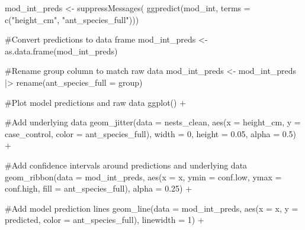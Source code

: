 \documentclass[
  letterpaper,
  DIV=11,
  numbers=noendperiod]{scrartcl}
\newenvironment{Shaded}{\begin{snugshade}}{\end{snugshade}}
\newcommand{\AttributeTok}[1]{\textcolor[rgb]{0.40,0.45,0.13}{#1}}
\newcommand{\CommentTok}[1]{\textcolor[rgb]{0.37,0.37,0.37}{#1}}
\newcommand{\DecValTok}[1]{\textcolor[rgb]{0.68,0.00,0.00}{#1}}
\newcommand{\FloatTok}[1]{\textcolor[rgb]{0.68,0.00,0.00}{#1}}
\newcommand{\FunctionTok}[1]{\textcolor[rgb]{0.28,0.35,0.67}{#1}}
\newcommand{\NormalTok}[1]{\textcolor[rgb]{0.00,0.23,0.31}{#1}}
\newcommand{\OtherTok}[1]{\textcolor[rgb]{0.00,0.23,0.31}{#1}}
\newcommand{\SpecialCharTok}[1]{\textcolor[rgb]{0.37,0.37,0.37}{#1}}
\newcommand{\StringTok}[1]{\textcolor[rgb]{0.13,0.47,0.30}{#1}}
\begin{document}
\begin{Shaded}
\begin{Highlighting}[]
\NormalTok{mod\_int\_preds }\OtherTok{\textless{}{-}} \FunctionTok{suppressMessages}\NormalTok{(}
  \FunctionTok{ggpredict}\NormalTok{(mod\_int,}
            \AttributeTok{terms =} \FunctionTok{c}\NormalTok{(}\StringTok{"height\_cm"}\NormalTok{,}
                      \StringTok{"ant\_species\_full"}\NormalTok{)))}

\CommentTok{\#Convert predictions to data frame}
\NormalTok{mod\_int\_preds }\OtherTok{\textless{}{-}} \FunctionTok{as.data.frame}\NormalTok{(mod\_int\_preds)}

\CommentTok{\#Rename group column to match raw data}
\NormalTok{mod\_int\_preds }\OtherTok{\textless{}{-}}\NormalTok{ mod\_int\_preds }\SpecialCharTok{|\textgreater{}}
  \FunctionTok{rename}\NormalTok{(}\AttributeTok{ant\_species\_full =}\NormalTok{ group)}

\CommentTok{\#Plot model predictions and raw data}
\FunctionTok{ggplot}\NormalTok{() }\SpecialCharTok{+}
  
  \CommentTok{\#Add underlying data}
  \FunctionTok{geom\_jitter}\NormalTok{(}\AttributeTok{data =}\NormalTok{ nests\_clean,}
              \FunctionTok{aes}\NormalTok{(}\AttributeTok{x =}\NormalTok{ height\_cm,}
                  \AttributeTok{y =}\NormalTok{ case\_control,}
                  \AttributeTok{color =}\NormalTok{ ant\_species\_full),}
              \AttributeTok{width =} \DecValTok{0}\NormalTok{,}
              \AttributeTok{height =} \FloatTok{0.05}\NormalTok{,}
              \AttributeTok{alpha =} \FloatTok{0.5}\NormalTok{) }\SpecialCharTok{+}
  
  \CommentTok{\#Add confidence intervals around predictions and underlying data}
  \FunctionTok{geom\_ribbon}\NormalTok{(}\AttributeTok{data =}\NormalTok{ mod\_int\_preds,}
              \FunctionTok{aes}\NormalTok{(}\AttributeTok{x =}\NormalTok{ x,}
                  \AttributeTok{ymin =}\NormalTok{ conf.low,}
                  \AttributeTok{ymax =}\NormalTok{ conf.high,}
                  \AttributeTok{fill =}\NormalTok{ ant\_species\_full),}
              \AttributeTok{alpha =} \FloatTok{0.25}\NormalTok{) }\SpecialCharTok{+}
  
  \CommentTok{\#Add model prediction lines}
  \FunctionTok{geom\_line}\NormalTok{(}\AttributeTok{data =}\NormalTok{ mod\_int\_preds,}
            \FunctionTok{aes}\NormalTok{(}\AttributeTok{x =}\NormalTok{ x,}
                \AttributeTok{y =}\NormalTok{ predicted,}
                \AttributeTok{color =}\NormalTok{ ant\_species\_full),}
            \AttributeTok{linewidth =} \DecValTok{1}\NormalTok{) }\SpecialCharTok{+}
  

\end{Highlighting}
\end{Shaded}
\end{document}

